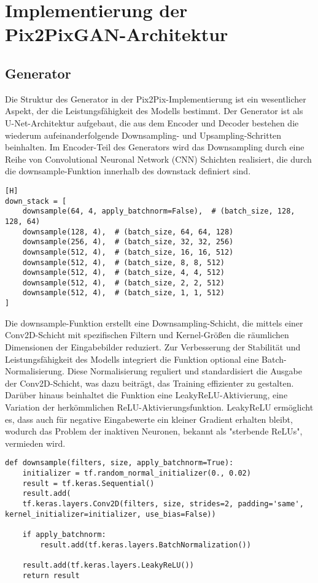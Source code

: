 \section{Implementierung der Pix2PixGAN-Architektur}
\subsection{Generator}

Die Struktur des Generator in der Pix2Pix-Implementierung ist ein wesentlicher Aspekt, der die Leistungsfähigkeit des Modells bestimmt. Der Generator ist als U-Net-Architektur aufgebaut, die aus dem Encoder und Decoder bestehen die wiederum  aufeinanderfolgende Downsampling- und Upsampling-Schritten beinhalten.
\newline
Im Encoder-Teil des Generators wird das Downsampling durch eine Reihe von Convolutional Neuronal Network (CNN) Schichten realisiert, die durch die downsample-Funktion innerhalb des downstack definiert sind. 

\begin{lstlisting}[language=pyhaff, caption={Downsampling-Schritt in Pix2Pix}, label={cod:Pix2PixGAN Generator}][H]
down_stack = [
	downsample(64, 4, apply_batchnorm=False),  # (batch_size, 128, 128, 64)
	downsample(128, 4),  # (batch_size, 64, 64, 128)
	downsample(256, 4),  # (batch_size, 32, 32, 256)
	downsample(512, 4),  # (batch_size, 16, 16, 512)
	downsample(512, 4),  # (batch_size, 8, 8, 512)
	downsample(512, 4),  # (batch_size, 4, 4, 512)
	downsample(512, 4),  # (batch_size, 2, 2, 512)
	downsample(512, 4),  # (batch_size, 1, 1, 512)
]
\end{lstlisting}

Die downsample-Funktion erstellt eine Downsampling-Schicht, die mittels einer Conv2D-Schicht mit spezifischen Filtern und Kernel-Größen die räumlichen Dimensionen der Eingabebilder reduziert. Zur Verbesserung der Stabilität und Leistungsfähigkeit des Modells integriert die Funktion optional eine Batch-Normalisierung. Diese Normalisierung reguliert und standardisiert die Ausgabe der Conv2D-Schicht, was dazu beiträgt, das Training effizienter zu gestalten.
Darüber hinaus beinhaltet die Funktion eine LeakyReLU-Aktivierung, eine Variation der herkömmlichen ReLU-Aktivierungsfunktion. LeakyReLU ermöglicht es, dass auch für negative Eingabewerte ein kleiner Gradient erhalten bleibt, wodurch das Problem der inaktiven Neuronen, bekannt als "sterbende ReLUs", vermieden wird.

\begin{lstlisting}[language=pyhaff, caption={Downsampling-Schicht in Pix2Pix}, label={cod:Pix2PixGAN Generator}]
def downsample(filters, size, apply_batchnorm=True):
	initializer = tf.random_normal_initializer(0., 0.02)
	result = tf.keras.Sequential()
	result.add(
	tf.keras.layers.Conv2D(filters, size, strides=2, padding='same', kernel_initializer=initializer, use_bias=False))
	
	if apply_batchnorm:
		result.add(tf.keras.layers.BatchNormalization())
	
	result.add(tf.keras.layers.LeakyReLU())
	return result
\end{lstlisting}


